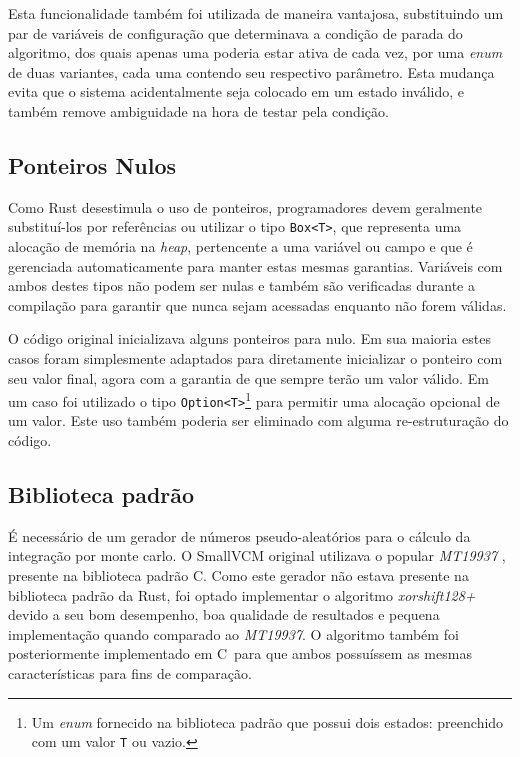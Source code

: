 \documentclass[tg]{mdtufsm}
\def\Cpp{{C\nolinebreak[4]\raisebox{.20ex}{\small\bf++}}}
\begin{document}
Esta funcionalidade também foi utilizada de maneira vantajosa, substituindo um par de variáveis de configuração que determinava a condição de parada do algoritmo, dos quais apenas uma poderia estar ativa de cada vez, por uma \emph{enum} de duas variantes, cada uma contendo seu respectivo parâmetro. Esta mudança evita que o sistema acidentalmente seja colocado em um estado inválido, e também remove ambiguidade na hora de testar pela condição.

\subsection{Ponteiros Nulos}

Como Rust desestimula o uso de ponteiros, programadores devem geralmente substituí-los por referências ou utilizar o tipo \texttt{Box<T>}, que representa uma alocação de memória na \emph{heap}, pertencente a uma variável ou campo e que é gerenciada automaticamente para manter estas mesmas garantias. Variáveis com ambos destes tipos não podem ser nulas e também são verificadas durante a compilação para garantir que nunca sejam acessadas enquanto não forem válidas.

O código original inicializava alguns ponteiros para nulo. Em sua maioria estes casos foram simplesmente adaptados para diretamente inicializar o ponteiro com seu valor final, agora com a garantia de que sempre terão um valor válido. Em um caso foi utilizado o tipo \texttt{Option<T>}\footnote{Um \emph{enum} fornecido na biblioteca padrão que possui dois estados: preenchido com um valor \texttt{T} ou vazio.} para permitir uma alocação opcional de um valor. Este uso também poderia ser eliminado com alguma re-estruturação do código.

\subsection{Biblioteca padrão}

É necessário de um gerador de números pseudo-aleatórios para o cálculo da integração por monte carlo. O SmallVCM original utilizava o popular \emph{MT19937}  \citep{matsumoto1998}, presente na biblioteca padrão \Cpp. Como este gerador não estava presente na biblioteca padrão da Rust, foi optado implementar o algoritmo \emph{xorshift128+} \citep{vigna2014} devido a seu bom desempenho, boa qualidade de resultados e pequena implementação quando comparado ao \emph{MT19937}. O algoritmo também foi posteriormente implementado em \Cpp\ para que ambos possuíssem as mesmas características para fins de comparação.
\end{document}
